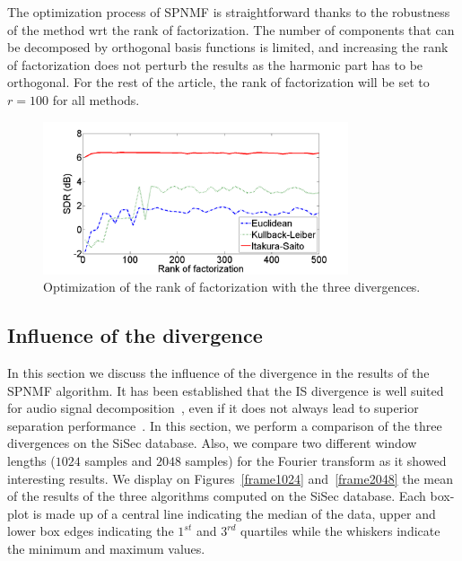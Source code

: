The optimization process of SPNMF is straightforward thanks to the robustness of the method wrt the rank of factorization. The number of components that can be decomposed by orthogonal basis functions is limited, and increasing the rank of factorization does not perturb the results as the harmonic part has to be orthogonal. For the rest of the article, the rank of factorization will be set to $r=100$ for all methods.



\begin{figure}[t]

  \centering 
  \includegraphics[width=9cm]{fig/RankOfFact}
  \caption{\label{RankOfFact} Optimization of the rank of factorization with the three divergences.}
  
\end{figure}




\subsection{Influence of the divergence}
\label{setup:divergence}

In this section we discuss the influence of the divergence in the results of the SPNMF algorithm. It has been established that the IS divergence is well suited for audio signal decomposition~\cite{gray1980distortion}, even if it does not always lead to superior separation performance~\cite{canadas2014percussive}. In this section, we perform a comparison of the three divergences on the SiSec database. Also, we compare two different window lengths ($1024$ samples and $2048$ samples) for the Fourier transform as it showed interesting results. We display on Figures~\ref{frame1024} and~\ref{frame2048} the mean of the results of the three algorithms computed on the SiSec database. Each box-plot is made up of a central line indicating the median of the data, upper and lower box edges indicating the $1^{st}$ and $3^{rd}$ quartiles while the whiskers indicate the minimum and maximum values. 

